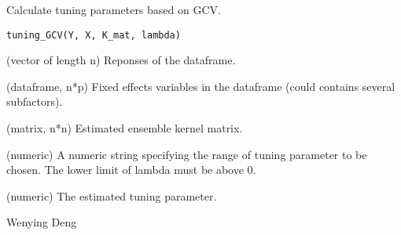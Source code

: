 \documentclass[a4paper]{book}
\begin{document}
%
\begin{Description}\relax
Calculate tuning parameters based on GCV.
\end{Description}
%
\begin{Usage}
\begin{verbatim}
tuning_GCV(Y, X, K_mat, lambda)
\end{verbatim}
\end{Usage}
%
\begin{Arguments}
\begin{ldescription}
\item[\code{Y}] (vector of length n) Reponses of the dataframe.

\item[\code{X}] (dataframe, n*p) Fixed effects variables in the dataframe (could
contains several subfactors).

\item[\code{K\_mat}] (matrix, n*n) Estimated ensemble kernel matrix.

\item[\code{lambda}] (numeric) A numeric string specifying the range of tuning parameter 
to be chosen. The lower limit of lambda must be above 0.
\end{ldescription}
\end{Arguments}
%
\begin{Details}\relax
{}

\end{Details}
%
\begin{Value}
\begin{ldescription}
\item[\code{lambda0}] (numeric) The estimated tuning parameter.
\end{ldescription}
\end{Value}
%
\begin{Author}\relax
Wenying Deng
\end{Author}
%
\end{document}
